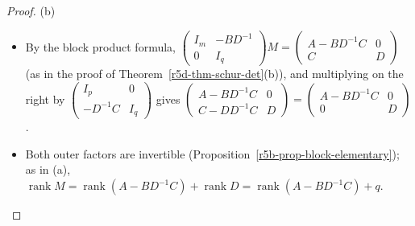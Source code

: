 \documentclass[12pt]{article}
\DeclareMathOperator{\rank}{rank}
\theoremstyle{definition}
\begin{document}
\begin{proof}
(b)
\begin{itemize}
\item By the block product formula,
\(\left(\begin{smallmatrix}I_m&-BD^{-1}\\0&I_q\end{smallmatrix}\right)M
=\left(\begin{smallmatrix}A-BD^{-1}C&0\\C&D\end{smallmatrix}\right)\) (as in the proof of
Theorem~\ref{r5d-thm-schur-det}(b)), and multiplying on the right by
\(\left(\begin{smallmatrix}I_p&0\\-D^{-1}C&I_q\end{smallmatrix}\right)\) gives
\(\left(\begin{smallmatrix}A-BD^{-1}C&0\\C-DD^{-1}C&D\end{smallmatrix}\right)
=\left(\begin{smallmatrix}A-BD^{-1}C&0\\0&D\end{smallmatrix}\right)\).
\item Both outer factors are invertible (Proposition~\ref{r5b-prop-block-elementary}); as in (a),
\(\rank M=\rank(A-BD^{-1}C)+\rank D=\rank(A-BD^{-1}C)+q\).\qedhere
\end{itemize}
\end{proof}
\end{document}
